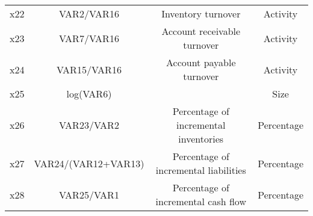 \documentclass[11pt]{article}
\begin{document}
\begin{center}
\begin{tabular}{cccc}
x22 & VAR2/VAR16 & Inventory turnover & Activity\\
x23 & VAR7/VAR16 & Account receivable turnover & Activity\\
x24 & VAR15/VAR16 & Account payable turnover & Activity\\
x25 & log(VAR6) & & Size\\
x26 & VAR23/VAR2 & Percentage of incremental inventories & Percentage\\
x27 & VAR24/(VAR12+VAR13) & Percentage of incremental liabilities & Percentage\\
x28 & VAR25/VAR1 & Percentage of incremental cash flow & Percentage\\ 
\hline\hline
\end{tabular}
\end{center}
 \vskip 0.2in
 
\end{document}

